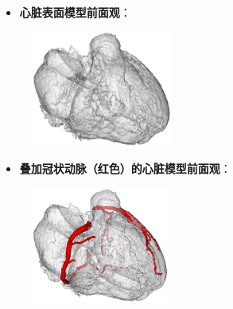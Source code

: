 \begin{frame}
\begin{itemize}
  \item \textbf{心脏表面模型前面观}：
\end{itemize}
\begin{figure}[t]
\centering
\includegraphics[height=1.5in]{../../Figures/gac/heart/heart.eps}
\end{figure}
\end{frame}

\begin{frame}
\begin{itemize}
  \item \textbf{叠加冠状动脉（红色）的心脏模型前面观}：
\end{itemize}
\begin{figure}[t]
\centering
\includegraphics[height=1.5in]{../../Figures/gac/heart/heart_with_ca.eps}
\end{figure}
\end{frame} 


 